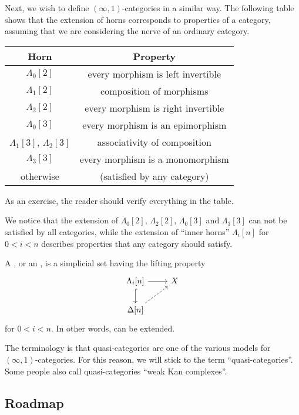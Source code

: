 Next, we wish to define $(\infty,1)$-categories in a similar way.
The following table shows that the extension of horns corresponds to 
properties of a category,
assuming that we are considering the nerve of an ordinary category.
\begin{center}
    \begin{tabular}{cc}
        \textbf{Horn} & \textbf{Property} \\ \hline
        $\Lambda_0[2]$ & every morphism is left invertible \\
        $\Lambda_1[2]$ & composition of morphisms \\
        $\Lambda_2[2]$ & every morphism is right invertible \\
        $\Lambda_0[3]$ & every morphism is an epimorphism \\
        $\Lambda_1[3]$, $\Lambda_2[3]$ & associativity of composition \\
        $\Lambda_3[3]$ & every morphism is a monomorphism \\
        otherwise & (satisfied by any category)
    \end{tabular}
\end{center}
As an exercise, the reader should verify everything in the table.

We notice that the extension of
$\Lambda_0[2]$, $\Lambda_2[2]$, $\Lambda_0[3]$ and $\Lambda_3[3]$
can not be satisfied by all categories,
while the extension of ``inner horns'' $\Lambda_i[n]$ for $0<i<n$
describes properties that any category should satisfy.

\begin{definition}
    A , or an ,
    is a simplicial set having the lifting property
    \[\begin{tikzcd}
        \Lambda_i[n]\ar[d,hook]\ar[r] & X \\
        \Delta[n]\ar[ur,dashed]
    \end{tikzcd}\]
    for $0<i<n$. In other words,  can be extended.
\end{definition}

The terminology is that quasi-categories are 
one of the various models for $(\infty,1)$-categories.
For this reason, we will stick to the term ``quasi-categories''.
Some people also call quasi-categories ``weak Kan complexes''.

\subsection{Roadmap}

